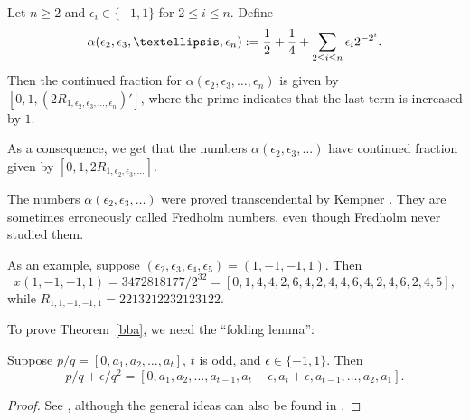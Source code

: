 \documentclass[12pt,reqno]{article}
\begin{document}
\begin{theorem}
Let $n\geq 2$ and $\epsilon_i \in \{ -1, 1\}$ for $2 \leq i \leq n$.
Define
$$\alpha(\epsilon_2, \epsilon_3, \ldots, \epsilon_n) :=
	{1\over 2} + {1 \over 4} + \sum_{2\leq i\leq n} {\epsilon_i}2^{-2^i} .$$
Then the continued fraction for
$\alpha(\epsilon_2, \epsilon_3, \ldots, \epsilon_n)$
is given by $[0, 1, (2R_{1, \epsilon_2, \epsilon_3, \ldots, \epsilon_n})']$,
where the prime indicates that the last term is increased by $1$.

As a consequence, we get that the numbers
$\alpha(\epsilon_2, \epsilon_3,\ldots)$
have continued fraction given by
$[0, 1, 2R_{1, \epsilon_2, \epsilon_3, \ldots}]$.
\label{bba}
\end{theorem}

\begin{remark}
The numbers $\alpha(\epsilon_2, \epsilon_3,\ldots)$ were proved transcendental by Kempner \cite{Kempner:1916}.
They are sometimes erroneously called Fredholm numbers, even though
Fredholm never studied them.
\end{remark}

As an example, suppose $(\epsilon_2,\epsilon_3,\epsilon_4,\epsilon_5) = 
(1,-1,-1,1)$.   Then 
$$x(1,-1,-1,1) = 3472818177/2^{32} = [0, 1, 4, 4, 2, 6, 4, 2, 4, 4, 6, 4, 2, 4, 6, 2, 4, 5],$$ while
$R_{1,1,-1,-1, 1} = 2213212232123122$.

To prove Theorem~\ref{bba}, we need the ``folding lemma'':
\begin{lemma}
Suppose $p/q = [0, a_1, a_2,\ldots, a_t]$, $t$ is odd, and
$\epsilon \in \{-1, 1\}$.  Then
$$p/q + \epsilon/q^2 = [0, a_1, a_2, \ldots, a_{t-1}, a_t - \epsilon,
a_t + \epsilon, a_{t-1}, \ldots, a_2, a_1].$$
\label{lem1}
\end{lemma}

\begin{proof}
See \cite[p.~177]{Dekking&MendesFrance&vanderPoorten:1982}, although
the general ideas can also be found in
\cite{Shallit:1979,Shallit:1982b}.
\end{proof}
\end{document}
